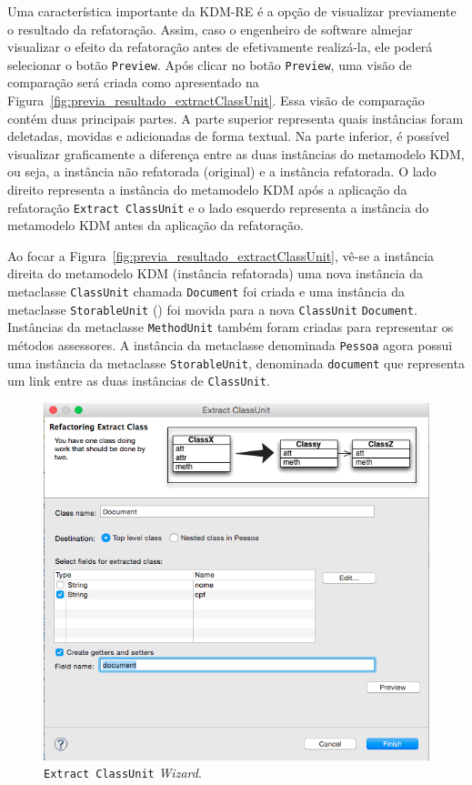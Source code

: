 Uma característica importante da KDM-RE é a opção de visualizar previamente o resultado da refatoração. Assim, caso o engenheiro de software almejar visualizar o efeito da refatoração antes de efetivamente realizá-la, ele poderá selecionar o botão \texttt{Preview}. Após clicar no botão \texttt{Preview}, uma visão de comparação será criada como apresentado na Figura~\ref{fig:previa_resultado_extractClassUnit}. Essa visão de comparação contém duas principais partes. A parte superior representa quais instâncias foram deletadas, movidas e adicionadas de forma textual. Na parte inferior, é possível visualizar graficamente a diferença entre as duas instâncias do metamodelo KDM, ou seja, a instância não refatorada (original) e a instância refatorada. O lado direito representa a instância do metamodelo KDM após a aplicação da refatoração \texttt{Extract ClassUnit} e o lado esquerdo representa a instância do metamodelo KDM antes da aplicação da refatoração. 

Ao focar a Figura~\ref{fig:previa_resultado_extractClassUnit}, vê-se a instância direita do metamodelo KDM (instância refatorada) uma nova instância da metaclasse \texttt{ClassUnit} chamada \texttt{Document} foi criada e uma instância da metaclasse \texttt{StorableUnit} () foi movida para a nova \texttt{ClassUnit} \texttt{Document}. Instâncias da metaclasse \texttt{MethodUnit} também foram criadas para representar os métodos assessores. A instância da metaclasse denominada \texttt{Pessoa} agora possui uma instância da metaclasse \texttt{StorableUnit}, denominada \texttt{document} que representa um link entre as duas instâncias de \texttt{ClassUnit}.

\begin{figure}[h]
	\centering
	\caption{\texttt{Extract ClassUnit} \textit{Wizard}.}
	\label{fig:kdm_re_wizard_extract_class}
	\includegraphics[scale=0.5]{images/extractClassEasierToExplainerEMFCOmpare}
	\fautor
\end{figure}

